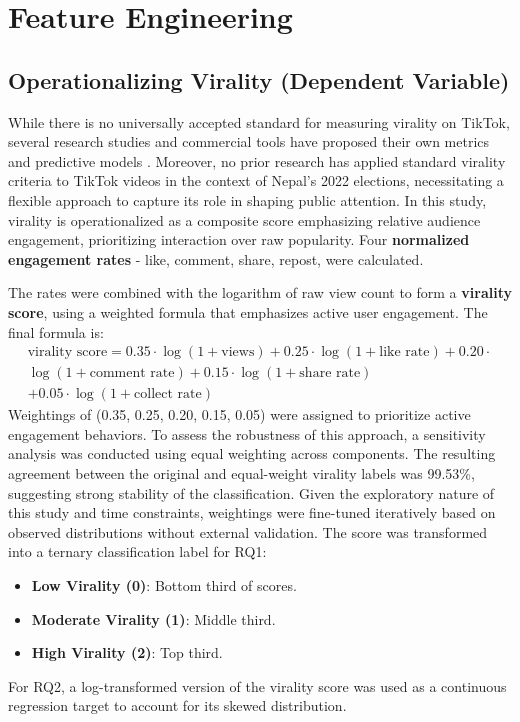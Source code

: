 \documentclass[12pt,a4paper]{report}
\begin{document}
\section{Feature Engineering}
\subsection{Operationalizing Virality (Dependent Variable)}
While there is no universally accepted standard for measuring virality on TikTok, several research studies and commercial tools have proposed their own metrics and predictive models \parencite{roring2024decoding, SahJordan2025DecodingReddit}. Moreover, no prior research has applied standard virality criteria to TikTok videos in the context of Nepal’s 2022 elections, necessitating a flexible approach to capture its role in shaping public attention. In this study, virality is operationalized as a composite score emphasizing relative audience engagement, prioritizing interaction over raw popularity.
Four \textbf{normalized engagement rates} - like, comment, share, repost, were calculated.

The rates were combined with the logarithm of raw view count to form a \textbf{virality score}, using a weighted formula that emphasizes active user engagement. The final formula is:
\begin{multline}
\text{virality score} = 0.35 \cdot \log(1 + \text{views}) + 0.25 \cdot \log(1 + \text{like rate}) + 0.20 \cdot \\ \log(1 + \text{comment rate}) + 0.15 \cdot \log(1 + \text{share rate}) \\ + 0.05 \cdot \log(1 + \text{collect rate})
\end{multline}
Weightings of (0.35, 0.25, 0.20, 0.15, 0.05) were assigned to prioritize active engagement behaviors. To assess the robustness of this approach, a sensitivity analysis was conducted using equal weighting across components. The resulting agreement between the original and equal-weight virality labels was 99.53\%, suggesting strong stability of the classification. Given the exploratory nature of this study and time constraints, weightings were fine-tuned iteratively based on observed distributions without external validation.
The score was transformed into a ternary classification label for RQ1:
\begin{itemize}
    \item \textbf{Low Virality (0)}: Bottom third of scores.
    \item \textbf{Moderate Virality (1)}: Middle third.
    \item \textbf{High Virality (2)}: Top third.
\end{itemize}
For RQ2, a log-transformed version of the virality score was used as a continuous regression target to account for its skewed distribution.
\newpage
\end{document}
